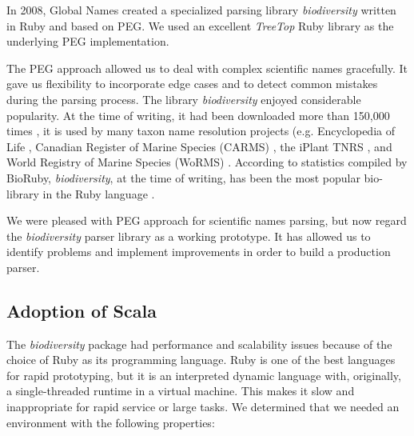 \documentclass{bmcart}
\begin{document}
In 2008, Global Names created a specialized parsing library
\textit{biodiversity} \cite{biodiversity} written in Ruby and based on PEG. We used an excellent \textit{TreeTop} Ruby library \cite{treetop} as the underlying PEG implementation.

The PEG approach allowed us to deal with complex scientific names gracefully.
It gave us flexibility to incorporate edge cases and to detect common mistakes
during the parsing process. The library \textit{biodiversity} enjoyed
considerable popularity. At the time of writing, it had been downloaded more
than 150,000 times \cite{bdiv-downloads}, it is used by many taxon name
resolution projects (e.g. Encyclopedia of Life \cite{eol}, Canadian Register of
Marine Species (CARMS) \cite{carms}, the iPlant TNRS \cite{iplant}, and World
Registry of Marine Species (WoRMS) \cite{worms}.  According to statistics compiled by BioRuby, \textit{biodiversity}, at the time of writing, has been the most
popular bio-library in the Ruby language \cite{biogems}.

We were pleased with PEG approach for scientific names parsing, but now regard
the \textit{biodiversity} parser library as a working prototype. It has allowed us
to identify problems and implement improvements in order to build a production parser.

\subsection*{Adoption of Scala}

The \textit{biodiversity} package had performance and scalability issues because
of the choice of Ruby as its programming language. Ruby is one of the best
languages for rapid prototyping, but it is an interpreted dynamic language with,
originally, a single-threaded runtime in a virtual machine. This makes it slow
and inappropriate for rapid service or large tasks. We determined that we
needed an environment with the following properties:
\end{document}
